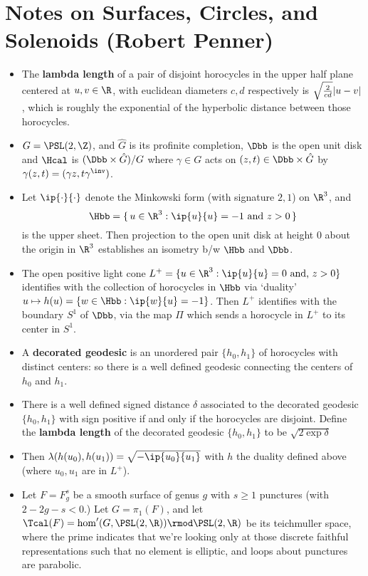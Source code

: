 \documentclass[11pt]{amsart}
\begin{document}
\section{Notes on Surfaces, Circles, and Solenoids (Robert Penner)}
\begin{itemize}
  \item The \textbf{lambda length} of a pair of disjoint horocycles in the upper half plane centered at $u,v\in \R$, with euclidean diameters $c,d$ respectively is $\sqrt{\frac{2}{cd}}\lvert u-v \rvert$, which is roughly the exponential of the hyperbolic distance between those horocycles.
  \item $G=\PSL(2,\Z)$, and $\hat{G}$ is its profinite completion, $\Dbb$ is the open unit disk and $\Hcal$ is $(\Dbb \times \hat{G})/G$ where $\gamma \in G$ acts on $(z,t) \in \Dbb \times \hat{G}$ by $\gamma(z,t)=(\gamma z, t \gamma^\inv)$.
  \item Let $\ip{\cdot}{\cdot}$ denote the Minkowski form (with signature $2,1$) on $\R^3$, and \[\Hbb=\set{u \in \R^3 : \ip{u}{u}=-1 \text{ and } z>0}\] is the upper sheet. Then projection to the open unit disk at height $0$ about the origin in $\R^3$ establishes an isometry b/w $\Hbb$ and $\Dbb$.
  \item The open positive light cone $L^+=\{ u \in \R^3: \ip{u}{u}=0 \text{ and, } z>0\}$ identifies with the collection of horocycles in $\Hbb$ via `duality' $u \mapsto h(u)=\{ w \in \Hbb: \ip{w}{u}=-1\} $. Then $L^+$ identifies with the boundary $S^1$ of $\Dbb$, via the map $\Pi$ which sends a horocycle in $L^+$ to its center in $S^1$. 
  \item A \textbf{decorated geodesic} is an unordered pair $\{h_0,h_1\}$ of horocycles with distinct centers: so there is a well defined geodesic connecting the centers of $h_0$ and $h_1$.
  \item There is a well defined signed distance $\delta$ associated to the decorated geodesic $\{ h_0,h_1\}$ with sign positive if and only if the horocycles are disjoint. Define the \textbf{lambda length} of the decorated geodesic $\{h_0,h_1\}$ to be $\sqrt{2 \exp{\delta}}$
  \item Then $\lambda ( h(u_0),h(u_1))= \sqrt{-\ip{u_0}{u_1}}$ with $h$ the duality defined above (where $u_0,u_1$ are in $L^+$).
  \item Let $F=F_g^s$ be a smooth surface of genus $g$ with $s\geq 1$ punctures (with $2-2g-s<0$.) Let $G=\pi_1(F)$, and let $\Tcal(F)=\hom'(G,\PSL(2,\R))\rmod \PSL(2,\R)$ be its teichmuller space, where the prime indicates that we're looking only at those discrete faithful representations such that no element is elliptic, and loops about punctures are parabolic. 

\end{itemize}
\end{document}
